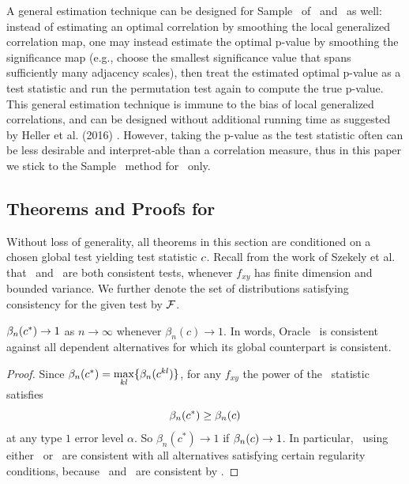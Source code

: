 \documentclass[11pt]{extarticle}
\begin{document}
A general estimation technique can be designed for Sample \Mgc~of \Dcorr~and \Mantel~as well: instead of estimating an optimal correlation by smoothing the local generalized correlation map, one may instead estimate the optimal p-value by smoothing the significance map (e.g., choose the smallest significance value that spans sufficiently many adjacency scales), then treat the estimated optimal p-value as a test statistic and run the permutation test again to compute the true p-value. This general estimation technique is immune to the bias of local generalized correlations, and can be designed without additional running time as suggested by Heller et al. (2016) \cite{heller2016consistent}. However, taking the p-value as the test statistic often can be less desirable and interpret-able than a correlation measure, thus in this paper we stick to the Sample \Mgc~method for \Mcorr~only.

\subsection{Theorems and Proofs for \Mgc}
\label{appen:theory}

Without loss of generality, all theorems in this section are conditioned on a chosen global test yielding test statistic $c$.
Recall from the work of Szekely et al. that \Dcorr~and \Mcorr~are both consistent tests, whenever $f_{xy}$ has finite dimension and bounded variance. We further denote the set of distributions satisfying consistency for the given test by $\mathcal{F}$.
\begin{thm}
\label{t:thm1}
$\beta_n(c^*) \rightarrow 1$ as $n \to \infty$ whenever $\beta_n(c) \rightarrow 1$.
In words, Oracle \Mgc~is consistent against all dependent alternatives for which its global counterpart is consistent.
\end{thm}
\begin{proof}
Since $\beta_n(c^*)=\underset{kl}{\max}\{\beta_n(c^{kl})\}$, for any $f_{xy}$ the power of the \Mgc~statistic satisfies
\begin{equation*}
\beta_n(c^*) \geq \beta_n(c)
\end{equation*}
at any type $1$ error level $\alpha$. So $\beta_n(c^*) \rightarrow 1$ if $\beta_n(c) \rightarrow 1$.
In particular, \Mgc~using either \Dcorr~or \Mcorr~are consistent with all alternatives satisfying certain regularity conditions, because \Dcorr~and \Mcorr~are consistent by \cite{SzekelyRizzoBakirov2007, SzekelyRizzo2013a}.
\end{proof}
\end{document}
